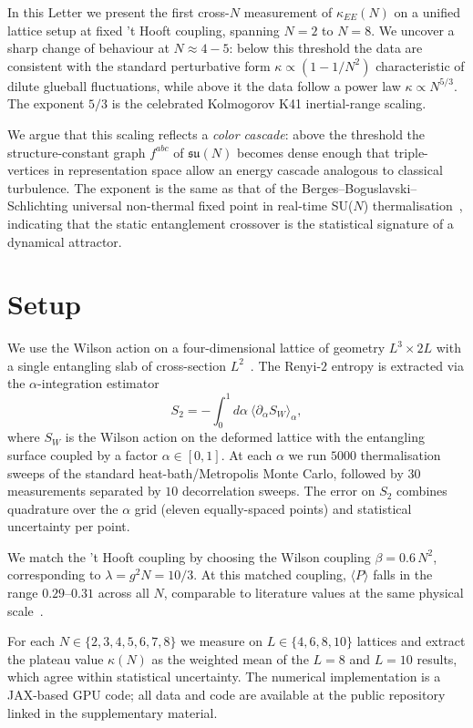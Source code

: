 \documentclass[aps,prl,reprint,nofootinbib,floatfix]{revtex4-2}
\begin{document}
In this Letter we present the first cross-$N$ measurement of $\kappa_{EE}(N)$ on a unified lattice setup at fixed 't Hooft coupling, spanning $N=2$ to $N=8$. We uncover a sharp change of behaviour at $N\approx 4{-}5$: below this threshold the data are consistent with the standard perturbative form $\kappa\propto(1-1/N^2)$ characteristic of dilute glueball fluctuations, while above it the data follow a power law $\kappa \propto N^{5/3}$. The exponent $5/3$ is the celebrated Kolmogorov K41 inertial-range scaling.

We argue that this scaling reflects a \emph{color cascade}: above the threshold the structure-constant graph $f^{abc}$ of $\mathfrak{su}(N)$ becomes dense enough that triple-vertices in representation space allow an energy cascade analogous to classical turbulence. The exponent is the same as that of the Berges--Boguslavski--Schlichting universal non-thermal fixed point in real-time SU($N$) thermalisation~\cite{BBS2013}, indicating that the static entanglement crossover is the statistical signature of a dynamical attractor.

\section{Setup}

We use the Wilson action on a four-dimensional lattice of geometry $L^3 \times 2L$ with a single entangling slab of cross-section $L^2$~\cite{BP2008}. The Renyi-$2$ entropy is extracted via the $\alpha$-integration estimator
\[
S_2 = -\int_0^1 d\alpha\ \langle \partial_\alpha S_W \rangle_\alpha,
\]
where $S_W$ is the Wilson action on the deformed lattice with the entangling surface coupled by a factor $\alpha\in[0,1]$. At each $\alpha$ we run $5000$ thermalisation sweeps of the standard heat-bath/Metropolis Monte Carlo, followed by $30$ measurements separated by $10$ decorrelation sweeps. The error on $S_2$ combines quadrature over the $\alpha$ grid (eleven equally-spaced points) and statistical uncertainty per point.

We match the 't Hooft coupling by choosing the Wilson coupling $\beta = 0.6\,N^2$, corresponding to $\lambda = g^2 N = 10/3$. At this matched coupling, $\langle P\rangle$ falls in the range $0.29$--$0.31$ across all $N$, comparable to literature values at the same physical scale~\cite{LTW2005}.

For each $N\in\{2,3,4,5,6,7,8\}$ we measure on $L\in\{4,6,8,10\}$ lattices and extract the plateau value $\kappa(N)$ as the weighted mean of the $L=8$ and $L=10$ results, which agree within statistical uncertainty. The numerical implementation is a JAX-based GPU code; all data and code are available at the public repository linked in the supplementary material.
\end{document}
